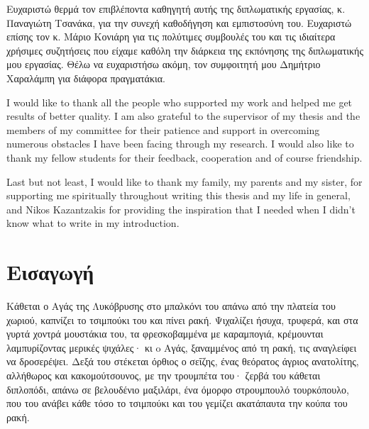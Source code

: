 \documentclass[diploma]{softlab-thesis}
\begin{document}

\begin{acknowledgementsgr}
Ευχαριστώ θερμά τον επιβλέποντα καθηγητή αυτής της διπλωματικής εργασίας, κ. Παναγιώτη Τσανάκα, για την συνεχή καθοδήγηση και εμπιστοσύνη του. Ευχαριστώ επίσης τον κ. Μάριο Κονιάρη για τις πολύτιμες συμβουλές του και τις ιδιαίτερα χρήσιμες συζητήσεις που είχαμε καθόλη την διάρκεια της εκπόνησης της διπλωματικής μου εργασίας. Θέλω να ευχαριστήσω ακόμη, τον συμφοιτητή μου Δημήτριο Χαραλάμπη για διάφορα πραγματάκια.
\end{acknowledgementsgr}

\begin{acknowledgementsen}
  I would like to thank all the people who supported my work and helped me get
  results of better quality.  I am also grateful to the supervisor of my thesis
  and the members of my committee for their patience and support in overcoming
  numerous obstacles I have been facing through my research.  I would also like
  to thank my fellow students for their feedback, cooperation and of course
  friendship.

  Last but not least, I would like to thank my family, my parents and my
  sister, for supporting me spiritually throughout writing this thesis and
  my life in general, and Nikos Kazantzakis for providing the inspiration
  that I needed when I didn't know what to write in my introduction.
\end{acknowledgementsen}



\tableofcontents
\listoffigures



\mainmatter

\chapter{Εισαγωγή}

Κάθεται ο Αγάς της Λυκόβρυσης στο μπαλκόνι του απάνω από την πλατεία του
χωριού, καπνίζει το τσιμπούκι του και πίνει ρακή. Ψιχαλίζει ήσυχα, τρυφερά,
και στα γυρτά χοντρά μουστάκια του, τα φρεσκοβαμμένα με καραμπογιά,
κρέμουνται λαμπυρίζοντας μερικές ψιχάλες· κι o Αγάς, ξαναμμένος από τη ρακή,
τις αναγλείφει να δροσερέψει. Δεξά του στέκεται όρθιος ο σεΐζης, ένας
θεόρατος άγριος ανατολίτης, αλλήθωρος και κακομούτσουνος, με την τρουμπέτα
του· ζερβά του κάθεται διπλοπόδι, απάνω σε βελουδένιο μαξιλάρι, ένα όμορφο
στρουμπουλό τουρκόπουλο, που του ανάβει κάθε τόσο το τσιμπούκι και του
γεμίζει ακατάπαυτα την κούπα του ρακή.
\end{document}
